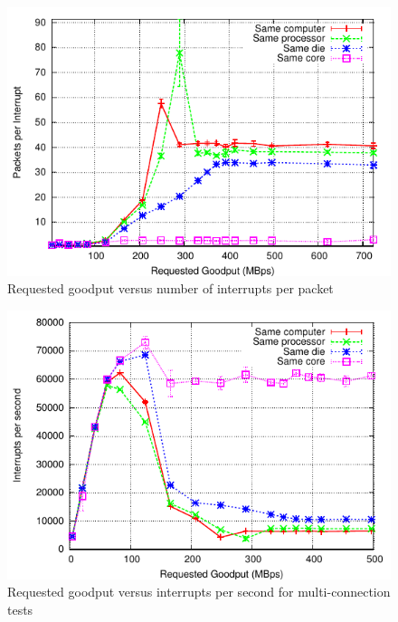 \documentclass[conference, compsoc]{IEEEtran}
\begin{document}
\begin{figure}[tb]
    \begin{center}
      \includegraphics[height=0.65\columnwidth]{Graphs/intel/two_machines/4_connections/requested_goodput_vs_pktsperint}
    \end{center}
    \caption{Requested goodput versus number of interrupts per packet}
    \label{fig:pktsperinter}
\end{figure}

\begin{figure}[tb]
    \begin{center}
      \includegraphics[height=0.65\columnwidth]{Graphs/intel/two_machines/4_connections/requested_goodput_vs_intrpers}
    \end{center}
    \caption{Requested goodput versus interrupts per second for multi-connection tests}
    \label{fig:multiintrpers}
\end{figure}
\end{document}
